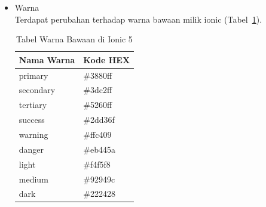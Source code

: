 \begin{enumerate}
\begin{itemize}
\begin{itemize}
			Properti selected telah dihapus. Sebagai gantinya harus mengatur properti nilai pada ion-select induk agar sesuai dengan opsi terpilih yang diinginkan (Kode~\ref{lst:selectOption}).
			\begin{lstlisting}[language=php, label={lst:selectOption}, caption=Kode Program untuk Select Option]
<ion-select value="two">
	<ion-select-option value="one">One</ion-select-option>
	<ion-select-option value="two">Two</ion-select-option>
</ion-select>
			\end{lstlisting}
\newpage
			\item Toast \\
			Properti close button seperti showCloseButton dan closeButtonText telah dihapus. Sebagai gantinya, gunakan buttons array untuk fungsi batal (Kode~\ref{lst:toast}.
			\begin{lstlisting}[language=php, label={lst:toast}, caption=Kode Program untuk Toast]
async presentToast() {
	const toast = await this.toastController.create({
		message: 'Your settings have been saved.',
		buttons: [	
		{
			text: 'Close',
			role: 'cancel',
			handler: () => {
			console.log('Close clicked');	
		}
		}
		]
	});
toast.present();
}
			\end{lstlisting}
		\end{itemize}
		Selain yang sudah disebutkan, terdapat beberapa komponen lain yang mendapat perubahan di Ionic 5, namun tidak ditulis di dalam dokumen skripsi ini. Komponen-komponen tersebut antara lain Action Sheet, Anchor, Card, FAB, Item, Menu Button, Nav Link, Radio, Segment, Segment Button, Skeleton Text, Split Pane, dan Tabs~\footnote{\textit{`Breaking Changes'} https://github.com/ionic-team/ionic-framework/blob/main/BREAKING.md, Diakses pada 20 November 2021. \label{ref:breakingChangesIonic5}}.
		\item Warna \\
		Terdapat perubahan terhadap warna bawaan milik ionic (Tabel~\ref{table:colors}).
		\begin{table}[H]
		\centering
			\begin{tabular}{|l|l|}
				\hline
				Nama Warna & Kode HEX \\ \hline
				primary    & \#3880ff \\ \hline
				secondary  & \#3dc2ff \\ \hline
				tertiary   & \#5260ff \\ \hline
				success    & \#2dd36f \\ \hline
				warning    & \#ffc409 \\ \hline
				danger     & \#eb445a \\ \hline
				light      & \#f4f5f8 \\ \hline
				medium     & \#92949c \\ \hline
				dark       & \#222428 \\ \hline
			\end{tabular}
			\caption{Tabel Warna Bawaan di Ionic 5}
			\label{table:colors}
		\end{table}
		

\end{itemize}
\end{enumerate}
